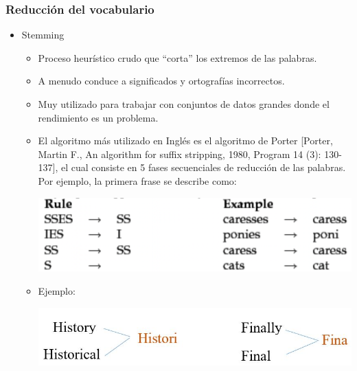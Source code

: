 \documentclass[
10pt, %
aspectratio=169, %
]{beamer}
\begin{document}
	\begin{frame}
		
		\frametitle{Reducción del vocabulario}
		
		\begin{itemize}
			\item Stemming
			
			\begin{itemize}
				\item Proceso heurístico crudo que ``corta'' los extremos de las palabras.
				
				\item A menudo conduce a significados y ortografías incorrectos.
				
				\item Muy utilizado para trabajar con conjuntos de datos grandes donde el rendimiento es un problema.
				
				\item El algoritmo más utilizado en Inglés es el algoritmo de Porter [Porter, Martin F., An algorithm for suffix stripping, 1980, Program 14 (3): 130-137], el cual consiste en 5 fases secuenciales de reducción de las palabras. Por ejemplo, la primera frase se describe como: 
				
				\begin{centering}
					\includegraphics[scale=0.25]{porter.png}
				\end{centering}
				
				\pause
				\item Ejemplo:
				
				\begin{centering}
					\includegraphics[scale=0.7]{stemming.jpg}
				\end{centering}
				
			\end{itemize}
			
		\end{itemize}
		
	\end{frame}
	
\end{document}
